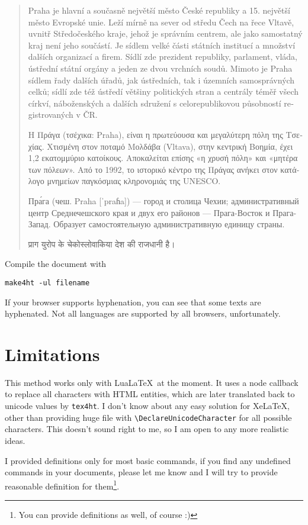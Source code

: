\documentclass{article}
\begin{document}
\begin{quotation}
\begin{czech}
Praha je hlavní a současně největší město České republiky a 15. největší město
Evropské unie. Leží mírně na sever od středu Čech na řece Vltavě, uvnitř
Středočeského kraje, jehož je správním centrem, ale jako samostatný kraj není
jeho součástí. Je sídlem velké části státních institucí a množství dalších
organizací a firem. Sídlí zde prezident republiky, parlament, vláda, ústřední
státní orgány a jeden ze dvou vrchních soudů. Mimoto je Praha sídlem řady
dalších úřadů, jak ústředních, tak i územních samosprávných celků; sídlí zde
též ústředí většiny politických stran a centrály téměř všech církví,
náboženských a dalších sdružení s celorepublikovou působností registrovaných v
ČR.  
\end{czech}

\textgreek{Η Πράγα (τσέχικα: Praha), είναι η πρωτεύουσα και μεγαλύτερη πόλη της
  Τσεχίας. Χτισμένη στον ποταμό Μολδάβα (Vltava), στην κεντρική Βοημία, έχει
  1,2 εκατομμύριο κατοίκους. Αποκαλείται επίσης «η χρυσή πόλη» και «μητέρα των
  πόλεων». Από το 1992, το ιστορικό κέντρο της Πράγας ανήκει στον κατάλογο
  μνημείων παγκόσμιας κληρονομιάς της UNESCO.} 

\begin{russian}
Пра́га (чеш. Praha [ˈpraɦa]) — город и столица Чехии; административный центр Среднечешского края и двух его районов — Прага-Восток и Прага-Запад. Образует самостоятельную административную единицу страны.
\end{russian}

\begin{hindi}
  प्राग युरोप के चेकोस्लोवाकिया देश की राजधानी है।
\end{hindi}
\end{quotation}

Compile the document with 

\begin{verbatim}
make4ht -ul filename 
\end{verbatim}

If your browser supports hyphenation, you can see that some texts are
hyphenated. Not all languages are supported by all browsers, unfortunately.

\section{Limitations}

This method works only with Lua\LaTeX\ at the moment. It uses a node callback to
replace all characters with HTML entities, which are later translated back to
unicode values by \texttt{tex4ht}. I don't know about any easy solution for
Xe\LaTeX, other than providing huge file with \verb|\DeclareUnicodeCharacter| for all possible characters. This doesn't sound right to me, so I am open to any more realistic ideas.

I provided definitions only for most basic commands, if you find any undefined
commands in your documents, please let me know and I will try to provide reasonable definition for them\footnote{You can provide definitions as well, of course :)}.
\end{document}
